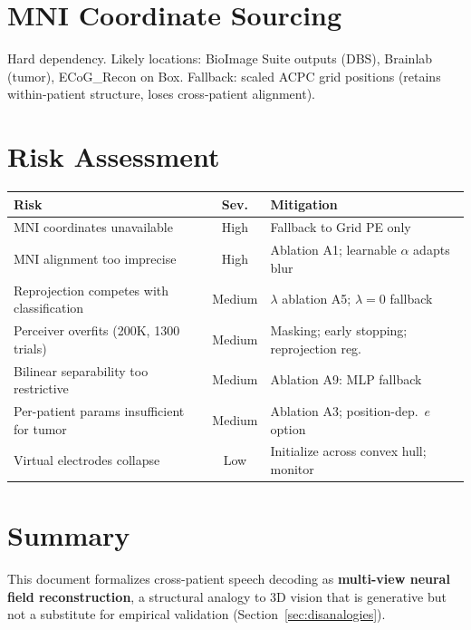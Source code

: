 \documentclass[11pt,letterpaper]{article}
\begin{document}
\section{MNI Coordinate Sourcing}

Hard dependency. Likely locations: BioImage Suite outputs (DBS), Brainlab (tumor), ECoG\_Recon on Box. Fallback: scaled ACPC grid positions (retains within-patient structure, loses cross-patient alignment).


\section{Risk Assessment}

\begin{table}[ht!]\centering\small
\begin{tabular}{@{}p{}cp{}@{}}
\toprule
\textbf{Risk} & \textbf{Sev.} & \textbf{Mitigation} \\
\midrule
MNI coordinates unavailable & High & Fallback to Grid PE only \\
MNI alignment too imprecise & High & Ablation A1; learnable $\alpha$ adapts blur \\
Reprojection competes with classification & Medium & $\lambda$ ablation A5; $\lambda{=}0$ fallback \\
Perceiver overfits (200K, 1300 trials) & Medium & Masking; early stopping; reprojection reg. \\
Bilinear separability too restrictive & Medium & Ablation A9: MLP fallback \\
Per-patient params insufficient for tumor & Medium & Ablation A3; position-dep.\ $e$ option \\
Virtual electrodes collapse & Low & Initialize across convex hull; monitor \\
\bottomrule
\end{tabular}
\end{table}


\section{Summary}

This document formalizes cross-patient speech decoding as \textbf{multi-view neural field reconstruction}, a structural analogy to 3D vision that is generative but not a substitute for empirical validation (Section~\ref{sec:disanalogies}).
\end{document}
